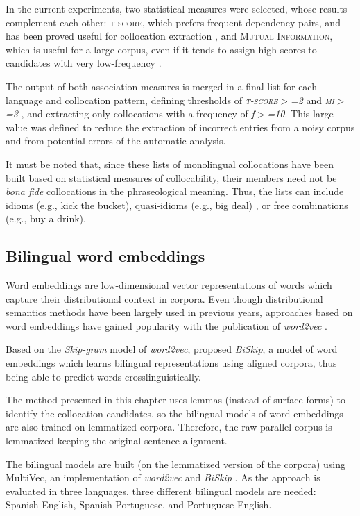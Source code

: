 \documentclass[output=paper
,modfonts
,nonflat]{langsci/langscibook}
\begin{document}
In the current experiments, two statistical measures were selected, whose results
complement each other: \textsc{t-score}, which prefers frequent dependency pairs,
and has been proved useful for collocation extraction \citep{krenn2001}, and
\textsc{Mutual Information}, which is useful for a large corpus, even if it
tends to assign high scores to candidates with very low-frequency \citep{pecina2010lexical}.

The output of both association measures is merged in a final list for each
language and collocation pattern, defining thresholds of \emph{\textsc{t-score$>$=2}} and
\emph{\textsc{mi}$>$=3} \citep{stubbs1995}, and extracting only collocations with a frequency
of \emph{f$>$=10}. This large value was defined to reduce the extraction of incorrect
entries from a noisy corpus and from potential errors of the automatic analysis.

It must be noted that, since these lists of monolingual collocations have been built
based on statistical measures of collocability, their members need not be
\emph{bona fide} collocations in the phraseological meaning. Thus, the lists can include
idioms (e.g., kick the bucket), quasi-idioms (e.g., big deal) \citep{melcuk98},
or free combinations (e.g., buy a drink).

%
\subsection{Bilingual word embeddings}
\label{garcia:sec:models}
Word embeddings are low-dimensional vector representations of words which
capture their distributional context in corpora. Even though distributional
semantics methods have been largely used in previous years, approaches based
on word embeddings have gained popularity with the publication of \emph{word2vec}
\citep{mikolov2013}.

Based on the \emph{Skip-gram} model of \emph{word2vec}, \citet{bivec} proposed
\emph{BiSkip}, a model of word embeddings which learns bilingual representations
using aligned corpora, thus being able to predict words crosslinguistically.

The method presented in this chapter uses lemmas (instead of surface forms) to identify the
collocation candidates, so the bilingual models of word embeddings are also trained on
lemmatized corpora. Therefore, the raw parallel corpus is lemmatized keeping the original sentence alignment.

The bilingual models are built (on the lemmatized version of the corpora) using MultiVec,
an implementation of \emph{word2vec} and \emph{BiSkip} \citep{MultiVec}. As the approach
is evaluated in three languages, three different bilingual models are needed:
Spanish-English, Spanish-Portuguese, and Portuguese-English.
\end{document}
